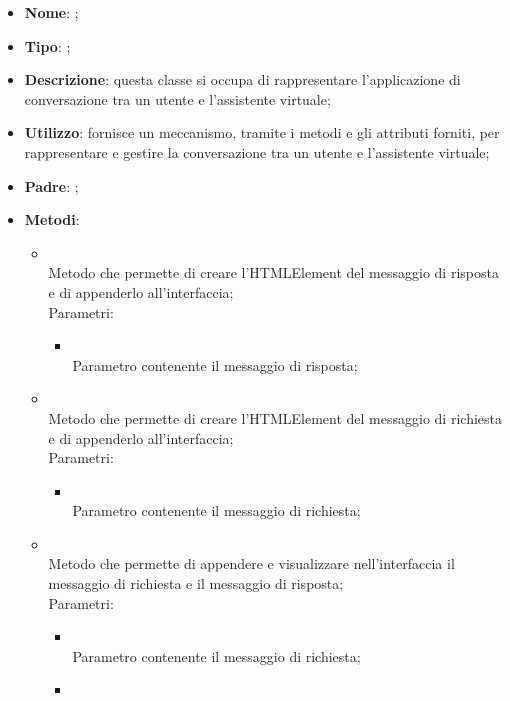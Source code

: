 \begin{itemize}
	\item \textbf{Nome}: ;
	\item \textbf{Tipo}: ;
	\item \textbf{Descrizione}: questa classe si occupa di rappresentare l'applicazione di conversazione tra un utente e l'assistente virtuale;
	\item \textbf{Utilizzo}: fornisce un meccanismo, tramite i metodi e gli attributi forniti, per rappresentare e gestire la conversazione tra un utente e l'assistente virtuale;
	\item \textbf{Padre}: ;
	\item \textbf{Metodi}:
	\begin{itemize}
		\item[]  \\
		Metodo che permette di creare l'HTMLElement del messaggio di risposta e di appenderlo all'interfaccia;\\
		Parametri:
		\begin{itemize}
			\item {} \\
			Parametro contenente il messaggio di risposta;
		\end{itemize}
		\item[]  \\
		Metodo che permette di creare l'HTMLElement del messaggio di richiesta e di appenderlo all'interfaccia;\\
		Parametri:
		\begin{itemize}
			\item {} \\
			Parametro contenente il messaggio di richiesta;
		\end{itemize}
		\item[]  \\
		Metodo che permette di appendere e visualizzare nell'interfaccia il messaggio di richiesta e il messaggio di risposta;\\
		Parametri:
		\begin{itemize}
			\item {} \\
			Parametro contenente il messaggio di richiesta;
			\item {} \\

\end{itemize}
\end{itemize}
\end{itemize}
